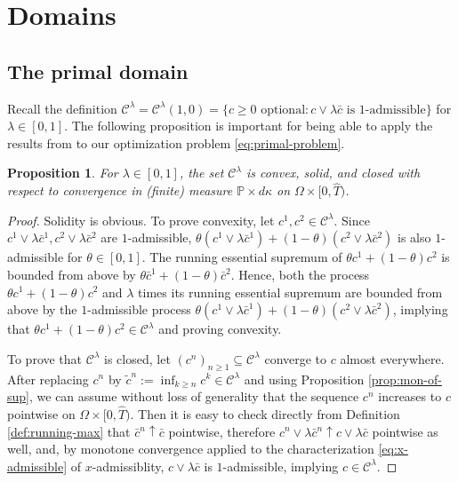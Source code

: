 \documentclass[11pt, oneside]{article}   	%
\theoremstyle{plain}
\newtheorem{prop}[thm]{Proposition}
\theoremstyle{definition}
\theoremstyle{remark}
\begin{document}

\section{Domains}\label{sec:domains}


\subsection{The primal domain}
Recall the definition $\mathcal{C}^\lambda=\mathcal{C}^\lambda(1,0)=\{c\geq 0 \text{ optional}:c\vee\lambda\bar{c}\text{ is 1-admissible}\}$ for $\lambda\in[0,1]$. The following proposition is important for being able to apply the results from \cite{mostovyi} to our optimization problem \eqref{eq:primal-problem}.
\begin{prop}\label{prop:C-bipolar}
For $\lambda\in[0,1]$, the set $\mathcal{C}^\lambda$ is convex, solid, and closed with respect to convergence in (finite) measure $\mathbb{P}\times d\kappa$ on $\Omega\times[0,\hat{T})$.
\end{prop}
\begin{proof} Solidity is obvious. To prove convexity, let $c^1,c^2\in\mathcal{C}^\lambda$. Since $c^1\vee\lambda\bar{c}^1,c^2\vee\lambda\bar{c}^2$ are $1$-admissible, $\theta(c^1\vee\lambda\bar{c}^1)+(1-\theta)(c^2\vee\lambda\bar{c}^2)$ is also $1$-admissible for $\theta\in[0,1]$. The running essential supremum of $\theta c^1+(1-\theta)c^2$ is bounded from above by $\theta\bar{c}^1+(1-\theta)\bar{c}^2$. Hence, both the process $\theta c^1+(1-\theta)c^2$ and $\lambda$ times its running essential supremum are bounded from above by the $1$-admissible process $\theta(c^1\vee\lambda\bar{c}^1)+(1-\theta)(c^2\vee\lambda\bar{c}^2)$, implying that $\theta c^1+(1-\theta)c^2\in\mathcal{C}^\lambda$ and proving convexity.

To prove that $\mathcal{C}^\lambda$ is closed, let $(c^n)_{n\geq1}\subseteq\mathcal{C}^\lambda$ converge to $c$ almost everywhere. After replacing $c^n$ by $\tilde{c}^n:=\inf_{k\geq n}c^k\in\mathcal{C}^\lambda$ and using Proposition \ref{prop:mon-of-sup}, we can assume without loss of generality that the sequence $c^n$ increases to $c$ pointwise on $\Omega\times[0,\hat{T})$. Then it is easy to check directly from Definition \ref{def:running-max} that $\bar{c}^n\uparrow \bar{c}$ pointwise, therefore $c^n\vee\lambda\bar{c}^n\uparrow c\vee\lambda\bar{c}$ pointwise as well, and, by monotone convergence applied to the characterization \eqref{eq:x-admissible} of $x$-admissiblity, $c\vee\lambda\bar{c}$ is $1$-admissible, implying $c\in\mathcal{C}^\lambda$.
\end{proof}
\end{document}
